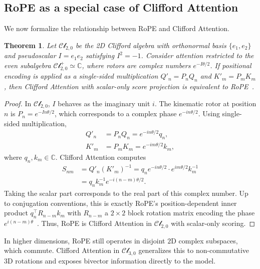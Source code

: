 \documentclass{article}
\theoremstyle{plain}
\newtheorem{theorem}{Theorem}[section]
\theoremstyle{definition}
\theoremstyle{remark}
\newcommand{\cliff}{\mathcal{Cl}}
\newcommand{\C}{\mathbb{C}}
\begin{document}
\subsection{RoPE as a special case of Clifford Attention}
\label{sec:rope_generalization}

We now formalize the relationship between RoPE and Clifford Attention.

\begin{theorem}
\label{thm:rope}
Let $\cliff_{2,0}$ be the 2D Clifford algebra with orthonormal basis $\{e_1,e_2\}$ and pseudoscalar $I=e_1e_2$ satisfying $I^2=-1$. Consider attention restricted to the even subalgebra $\cliff^+_{2,0}\simeq\C$, where rotors are complex numbers $e^{-I\theta/2}$. If positional encoding is applied as a \emph{single-sided} multiplication $Q'_n = P_n Q_n$ and $K'_m = P_m K_m$, then Clifford Attention with scalar-only score projection is equivalent to RoPE~\cite{su2024roformer}.
\end{theorem}

\begin{proof}
In $\cliff_{2,0}$, $I$ behaves as the imaginary unit $i$. The kinematic rotor at position $n$ is $P_n = e^{-In\theta/2}$, which corresponds to a complex phase $e^{-in\theta/2}$. Using single-sided multiplication,
\begin{align}
    Q'_n &= P_n Q_n = e^{-in\theta/2} q_n,\\
    K'_m &= P_m K_m = e^{-im\theta/2} k_m,
\end{align}
where $q_n,k_m\in\C$. Clifford Attention computes
\begin{align}
    S_{nm} &= Q'_n (K'_m)^{-1} 
    = q_n e^{-in\theta/2} \cdot e^{im\theta/2} k_m^{-1} \nonumber\\
           &= q_n k_m^{-1} e^{-i(n-m)\theta/2}.
\end{align}
Taking the scalar part corresponds to the real part of this complex number. Up to conjugation conventions, this is exactly RoPE's position-dependent inner product $q_n^\top R_{n-m} k_m$ with $R_{n-m}$ a $2\times2$ block rotation matrix encoding the phase $e^{i(n-m)\theta}$~\cite{su2024roformer}. Thus, RoPE is Clifford Attention in $\cliff_{2,0}$ with scalar-only scoring.
\end{proof}

In higher dimensions, RoPE still operates in disjoint $2$D complex subspaces, which commute. Clifford Attention in $\cliff_{3,0}$ generalizes this to non-commutative 3D rotations and exposes bivector information directly to the model.
\end{document}
